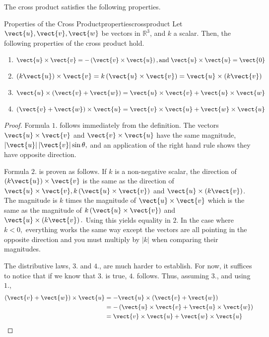 The cross product satisfies the following properties.

\begin{proposition}{Properties of the Cross Product}{propertiescrossproduct}
Let $\vect{u}, \vect{v}, \vect{w}$ be vectors in $\mathbb{R}^3$, and $k$ a scalar. Then, the following properties 
of the cross product hold.
\begin{enumerate}
\item 
$\vect{u}\times \vect{v}= -\left( \vect{v}\times \vect{u}\right), 
\mbox{and} \; \vect{u}\times \vect{u}=\vect{0}$
\item 
$\left( k \vect{u}\right)\times \vect{v}= k \left( \vect{u}\times \vect{v}\right) 
=\vect{u}\times \left( k \vect{v}\right)$
\item
$\vect{u}\times \left( \vect{v}+\vect{w}\right) =\vect{u}\times \vect{v}+\vect{u}\times \vect{w}$
\item 
$\left( \vect{v}+\vect{w}\right) \times \vect{u}=\vect{v} \times \vect{u}+\vect{w}\times \vect{u}$
\end{enumerate}
\end{proposition}

\begin{proof}
Formula $1.$ follows immediately from the definition. The vectors 
$\vect{u}\times \vect{v}$ and $\vect{v}\times \vect{u}$ have the same magnitude, 
$\left\vert \vect{u}\right\vert \left\vert \vect{v}\right\vert \sin
\theta ,$ and an application of the right hand rule shows they have opposite
direction. 

Formula $2.$ is proven as follows. If $k $ is a
non-negative scalar, the direction of $\left( k \vect{u}\right)
\times \vect{v}$ is the same as the direction of $\vect{u}\times \vect{v},
k \left( \vect{u}\times \vect{v}\right) $ and $\vect{u}\times \left(
k \vect{v}\right) $. The magnitude is  $k$ times the
magnitude of $\vect{u}\times \vect{v}$ which is the same as the magnitude of 
$k \left( \vect{u}\times \vect{v}\right) $ and $\vect{u}\times \left(
k \vect{v}\right) .$ Using this yields equality in $2$. In
the case where $k <0,$ everything works the same way except the vectors
are all pointing in the opposite direction and you must multiply by 
$\left\vert k \right\vert $ when comparing their magnitudes. 

The distributive laws, $3.$ and $4.$, are much harder to establish. For now, it suffices to
 notice that if we know that $3.$ is true, $4.$ follows. Thus, assuming $3.$, and using $1.$,
\begin{align*}
\left( \vect{v}+\vect{w}\right) \times \vect{u}& =-\vect{u}\times \left(
\vect{v}+\vect{w}\right) \\
& =-\left( \vect{u}\times \vect{v}+\vect{u}\times \vect{w}\right) \\
& =\vect{v}\times \vect{u}+\vect{w}\times \vect{u}
\end{align*}
\end{proof}

